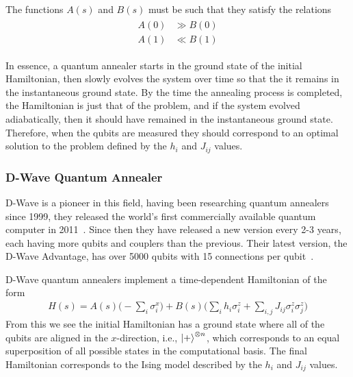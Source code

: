 The functions \( A(s) \) and \( B(s) \) must be such that they satisfy the relations
\begin{align}
\begin{split}
    A(0) &\gg B(0) \\
    A(1) &\ll B(1)
\end{split}
\end{align}

In essence, a quantum annealer starts in the ground state of the initial Hamiltonian, then slowly evolves the system over time so that the it remains in the instantaneous ground state.
By the time the annealing process is completed, the Hamiltonian is just that of the problem, and if the system evolved adiabatically, then it should have remained in the instantaneous ground state.
Therefore, when the qubits are measured they should correspond to an optimal solution to the problem defined by the \( h_i \) and \( J_{ij} \) values.

\subsubsection{D-Wave Quantum Annealer}
D-Wave is a pioneer in this field, having been researching quantum annealers since 1999, they released the world's first commercially available quantum computer in 2011~\cite{zyga_2011}.
Since then they have released a new version every 2-3 years, each having more qubits and couplers than the previous.
Their latest version, the D-Wave Advantage, has over 5000 qubits with 15 connections per qubit~\cite{dwave_advantage}.

D-Wave quantum annealers implement a time-dependent Hamiltonian of the form~\cite{dwave_qa}
\begin{align}
    H(s) = A(s) \bigg( -\sum_i \sigma_i^x \bigg) + B(s) \bigg( \sum_i h_i \sigma_i^z + \sum_{i,j} J_{ij} \sigma_i^z \sigma_j^z \bigg)
\end{align}
From this we see the initial Hamiltonian has a ground state where all of the qubits are aligned in the \( x \)-direction, i.e., \( \ket{+}^{\otimes n} \), which corresponds to an equal superposition of all possible states in the computational basis.
The final Hamiltonian corresponds to the Ising model described by the \( h_i \) and \( J_{ij} \) values.

